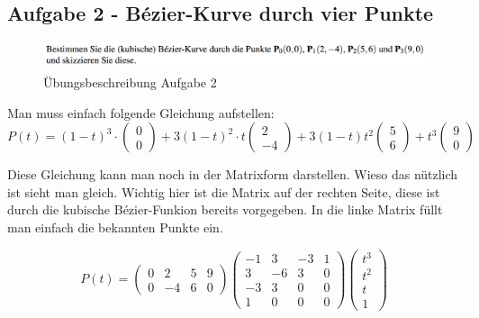 \subsection{Aufgabe 2 - Bézier-Kurve durch vier Punkte}
\begin{figure}[!ht]
	\centering
	\includegraphics[width=1.0\linewidth]{fig/ueb_curves_2}
	\caption{Übungsbeschreibung Aufgabe 2}
\end{figure}
Man muss einfach folgende Gleichung aufstellen:
\begin{displaymath}
P\left( t\right) = \left( 1-t\right)^3 \cdot \begin{pmatrix}0 \\ 0\end{pmatrix} + 3\left( 1-t\right)^2\cdot t \begin{pmatrix}2 \\ -4\end{pmatrix} + 3\left( 1-t\right)t^2\begin{pmatrix}5 \\ 6\end{pmatrix} + t^3\begin{pmatrix}9 \\ 0\end{pmatrix}
\end{displaymath}

Diese Gleichung kann man noch in der Matrixform darstellen. Wieso das nützlich ist sieht man gleich. Wichtig hier ist die Matrix auf der rechten Seite, diese ist durch die kubische Bézier-Funkion bereits vorgegeben. In die linke Matrix füllt man einfach die bekannten Punkte ein.

\begin{displaymath}
P(t) = 
\begin{pmatrix}
0 & 2 & 5 & 9 \\
0 & -4 & 6 & 0
\end{pmatrix}
\begin{pmatrix}
-1 & 3 & -3 & 1 \\
3 & -6 & 3 & 0 \\
-3 & 3 & 0 & 0 \\
1 & 0 & 0 & 0
\end{pmatrix}
\begin{pmatrix}
t^3\\
t^2\\
t\\
1
\end{pmatrix}
\end{displaymath}

